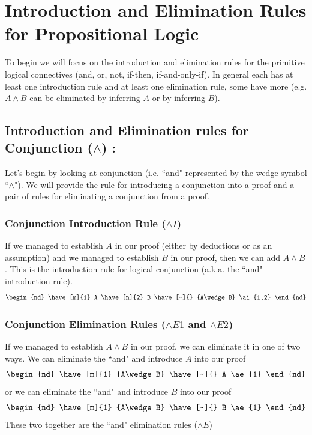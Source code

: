 \section{Introduction and Elimination Rules for Propositional Logic}
To begin we will focus on the introduction and elimination rules for the primitive logical connectives (and, or, not, if-then, if-and-only-if). In general each has at least one introduction rule and at least one elimination rule, some have more (e.g. $A\wedge B$ can be eliminated by inferring $A$ or by inferring $B$).

\subsection{Introduction and Elimination rules for Conjunction ($\wedge$) :}
Let's begin by looking at conjunction (i.e. ``and" represented by the wedge symbol ``$\wedge$"). We will provide the rule for introducing a conjunction into a proof and a pair of rules for eliminating a conjunction from a proof.
\subsubsection{Conjunction Introduction Rule ($\wedge I$)}
If we managed to establish $A$ in our proof (either by deductions or as an assumption) and we managed to establish $B$ in our proof, then we can add $A\wedge B$. This is the introduction rule for logical conjunction (a.k.a. the ``and" introduction rule).
\begin{equation}
    \begin{nd}
        \have[m]{1} A
        \have[n]{2} B
        \have[~]{} {A\wedge B} \ai{1,2}
    \end{nd} \nonumber
\end{equation}
\subsubsection{Conjunction Elimination Rules ($\wedge E1$ and $\wedge E2$)}
If we managed to establish $A\wedge B$ in our proof, we can eliminate it in one of two ways. We can eliminate the ``and" and introduce $A$ into our proof
\begin{equation}
    \begin{nd}
        \have[m]{1} {A\wedge B}
        \have[~]{} A \ae{1}
    \end{nd} \nonumber
\end{equation}
or we can eliminate the ``and" and introduce $B$ into our proof
\begin{equation}
    \begin{nd}
        \have[m]{1} {A\wedge B}
        \have[~]{} B \ae{1}
    \end{nd} \nonumber
\end{equation}
These two together are the ``and" elimination rules ($\wedge E$)

